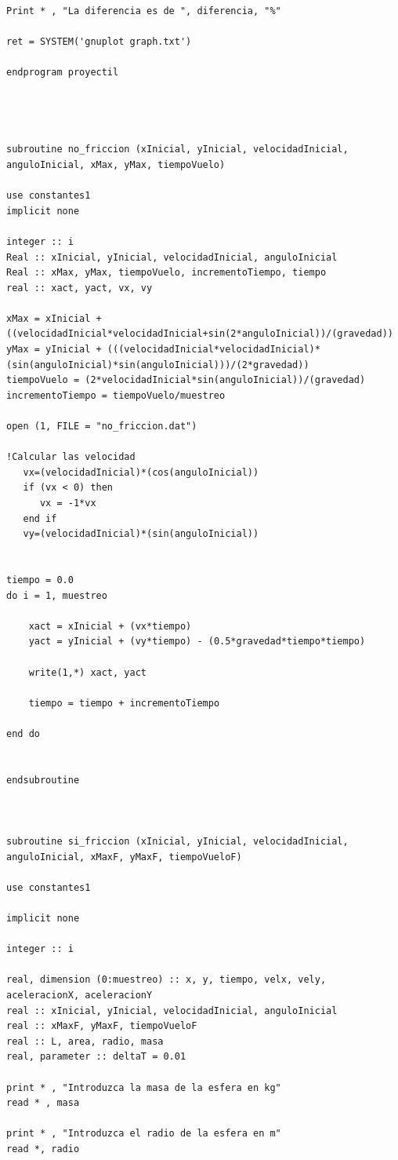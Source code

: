 \documentclass[10pt]{article}
\begin{document}
\begin{verbatim}
Print * , "La diferencia es de ", diferencia, "%"

ret = SYSTEM('gnuplot graph.txt')

endprogram proyectil




subroutine no_friccion (xInicial, yInicial, velocidadInicial, anguloInicial, xMax, yMax, tiempoVuelo)

use constantes1
implicit none

integer :: i
Real :: xInicial, yInicial, velocidadInicial, anguloInicial
Real :: xMax, yMax, tiempoVuelo, incrementoTiempo, tiempo
real :: xact, yact, vx, vy

xMax = xInicial + ((velocidadInicial*velocidadInicial+sin(2*anguloInicial))/(gravedad))
yMax = yInicial + (((velocidadInicial*velocidadInicial)*(sin(anguloInicial)*sin(anguloInicial)))/(2*gravedad))
tiempoVuelo = (2*velocidadInicial*sin(anguloInicial))/(gravedad)
incrementoTiempo = tiempoVuelo/muestreo

open (1, FILE = "no_friccion.dat")

!Calcular las velocidad
   vx=(velocidadInicial)*(cos(anguloInicial))
   if (vx < 0) then
      vx = -1*vx
   end if
   vy=(velocidadInicial)*(sin(anguloInicial))


tiempo = 0.0
do i = 1, muestreo

    xact = xInicial + (vx*tiempo)
    yact = yInicial + (vy*tiempo) - (0.5*gravedad*tiempo*tiempo)

    write(1,*) xact, yact
	
    tiempo = tiempo + incrementoTiempo

end do


endsubroutine



subroutine si_friccion (xInicial, yInicial, velocidadInicial, anguloInicial, xMaxF, yMaxF, tiempoVueloF)

use constantes1

implicit none 

integer :: i 

real, dimension (0:muestreo) :: x, y, tiempo, velx, vely, aceleracionX, aceleracionY
real :: xInicial, yInicial, velocidadInicial, anguloInicial
real :: xMaxF, yMaxF, tiempoVueloF
real :: L, area, radio, masa
real, parameter :: deltaT = 0.01

print * , "Introduzca la masa de la esfera en kg"
read * , masa

print * , "Introduzca el radio de la esfera en m"
read *, radio


\end{verbatim}
\end{document}
